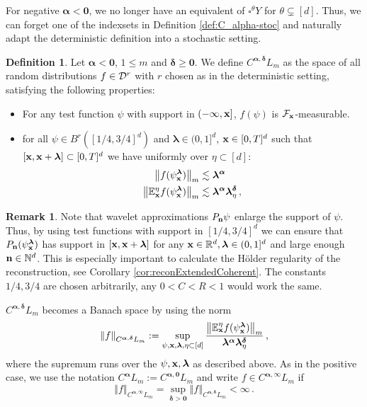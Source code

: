 \documentclass[12pt]{article}
\numberwithin{equation}{section}
\theoremstyle{plain}
\theoremstyle{definition}
\newtheorem{definition}[theorem]{Definition}
\newtheorem{remark}[theorem]{Remark}
\newcommand{\norm}[1]{\left\Vert #1\right\Vert}
\def\bR{\mathbb{R}}\def\bS{\mathbb{S}}
\def\bE{\mathbb{E}}\def\bW{\mathbb{W}}
\def\falpha{{\boldsymbol\alpha}}
\def\fdelta{{\boldsymbol\delta}}
\def\flambda{{\boldsymbol\lambda}}
\def\foo{{\boldsymbol 0}}
\begin{document}
For negative $\falpha < \foo$, we no longer have an equivalent of  $\square^\theta Y$ for $\theta\subsetneq [d]$. Thus, we can forget one of the indexsets in Definition \ref{def:C_alpha-stoc} and naturally adapt the deterministic definition into a stochastic setting.

\begin{definition}
    Let $\falpha<\foo$, $1\le m$ and $\fdelta\ge \foo$.  We define  $C^{\falpha,\fdelta}L_m$ as the space of all random distributions $f\in\mathcal{D}^r$ with $r$ chosen as in the deterministic setting, satisfying the following properties:
    
    \begin{itemize}
        \item For any test function $\psi$ with support in $(-\infty,\mathbf x]$, $f(\psi)$ is $\mathcal{F}_{\mathbf x}$-measurable.

        \item for all $\psi\in B^r([1/4,3/4]^d)$ and $\flambda\in(0,1]^d$, $\mathbf x\in[0,T]^d$ such that $[\fx,\fx+\flambda]\subset[0,T]^d$ we have  uniformly over $\eta\subset[d]$:
        \begin{align}
        \begin{split}\label{ineq:defNegativHoelderSpace}
            \norm{f(\psi^{\flambda}_\fx)}_m &\lesssim \flambda^{\falpha}\\
             \norm{\bE^\eta_\fx f(\psi^{\flambda}_\fx)}_m&\lesssim \flambda^{\falpha}\flambda^{\fdelta}_{\eta}\,,
        \end{split}
        \end{align}
    \end{itemize}
\end{definition}
\begin{remark}\label{rk:eps_rmk}
    Note that wavelet approximations $P_\mathbf n\psi$ enlarge the support of $\psi$. Thus, by using test functions with support in $[1/4,3/4]^d$ we can ensure that $P_\fn(\psi_\fx^\flambda)$ has support in $[\fx,\fx+\flambda]$ for any $\fx\in\bR^d,\flambda\in(0,1]^d$ and large enough $\mathbf n\in\mathbb{N}^d$. This is especially important to calculate the Hölder regularity of the reconstruction, see Corollary \ref{cor:reconExtendedCoherent}. The constants $1/4,3/4$ are chosen arbitrarily, any $0<C<R<1$ would work the same.
\end{remark}
$C^{\falpha,\fdelta}L_m$ becomes a Banach space by using the norm
\begin{equation*}
\norm{f}_{C^{\falpha,\fdelta}L_m}:= \sup_{\psi,\fx,\flambda,\eta\subset[d]}\frac{\norm{\bE^\eta_\fx f(\psi^{\flambda}_\fx)}_m}{\flambda^{\falpha}\flambda^{\fdelta}_{\eta}}\,,
\end{equation*}
where the supremum runs over the $\psi,\fx,\flambda$ as described above. As in the positive case, we use the notation $C^{\falpha}L_m := C^{\falpha,\foo}L_m$ and write $f\in C^{\falpha,\infty}L_m$ if
\[
    \norm{f}_{C^{\falpha,\infty}L_m} = \sup_{\fdelta >\foo} \norm{f}_{C^{\falpha,\fdelta}L_m}<\infty\,.
\]
\end{document}
